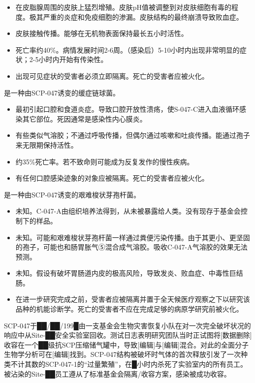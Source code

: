 

\begin{itemize}
\item {}在皮脂腺周围的皮肤上猛烈增殖。皮肤pH值被调整到对皮肤细胞有毒的程度。极其严重的炎症和免疫细胞的渗漏。皮肤结构的最终崩溃导致败血症。
\item {}皮肤接触传播。能够在无机物表面保持最长五小时活性。
\item {}死亡率约40\%。病情发展时间2-6周。（感染后）5-10小时内出现非常明显的症状；2-5小时内开始有传染性。
\item {}出现可见症状的受害者必须立即隔离。死亡的受害者应被火化。
\end{itemize}

是一种由SCP-047诱变的缓症链球菌。



\begin{itemize}
\item {}最初引起口腔和食道炎症。导致口腔开放性溃疡，使S-047-C进入血液循环感染其它部位。死因通常是感染性内心膜炎。
\item {}有些类似气溶胶；不通过呼吸传播，但偶尔通过咳嗽和吐痰传播。能通过孢子来无限期保持活性。
\item {}约35\%死亡率。若不致命则可能成为反复发作的慢性疾病。
\item {}有任何口腔感染迹象的对象应被隔离。死亡的受害者应被火化。
\end{itemize}

是一种由SCP-047诱变的艰难梭状芽孢杆菌。



\begin{itemize}
\item {}未知。C-047-A由组织培养法得到，从未被暴露给人类。没有现存于基金会控制下的样品。
\item {}未知。可能和艰难梭状芽孢杆菌一样通过粪便污染传播。由于其更小、更坚固的孢子，可能也和肠胃胀气⑤混合成气溶胶。吸收C-047-A气溶胶的效果无法预测。
\item {}未知。假设有破坏胃肠道内皮的极高风险，导致发炎、败血症、中毒性巨结肠。
\item {}在进一步研究完成之前，受害者应被隔离并置于全天候医疗观察之下以研究该品种的机能诊断学。死亡的受害者不应在完成足够的病原学研究前被火化。
\end{itemize}

SCP-047于██\slash ██\slash 199█由一支基金会生物灾害恢复小队在对一次完全破坏状况的响应中从Site-██安全实验室回收。测试日志表明研究团队当时正试图将{[}数据删除]收容在一个██级抗SCP压缩储气罐中，导致{[}编辑]与{[}编辑]混合。对此的全面分子生物学分析可在{[}编辑]找到。SCP-047结构被破坏时气体的首次释放引发了一次种类不计其数的SCP-047-1的“过量繁殖”，在█小时内杀死了实验室内的所有员工。被沾染的Site-██员工遵从了标准基金会隔离\slash 收容方案，感染被成功收容。
